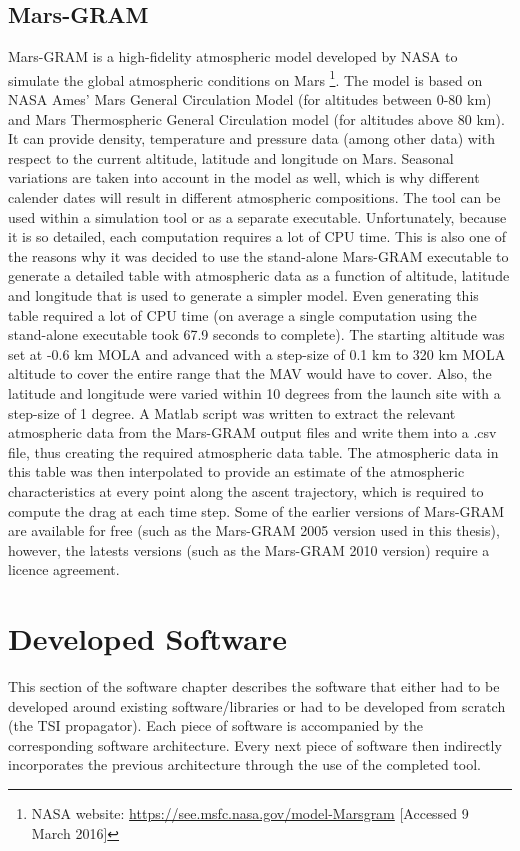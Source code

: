 \subsection{Mars-\ac{GRAM}}
\label{subsec:marsgram}
Mars-\ac{GRAM} is a high-fidelity atmospheric model developed by \ac{NASA} to simulate the global atmospheric conditions on Mars \citep{justus2008utilizing} \footnote{\ac{NASA} website: \url{https://see.msfc.nasa.gov/model-Marsgram} [Accessed 9 March 2016]}. The model is based on \ac{NASA} Ames' Mars General Circulation Model (for altitudes between 0-80 km) and Mars Thermospheric General Circulation model (for altitudes above 80 km). It can provide density, temperature and pressure data (among other data) with respect to the current altitude, latitude and longitude on Mars.  Seasonal variations are taken into account in the model as well, which is why different calender dates will result in different atmospheric compositions. The tool can be used within a simulation tool or as a separate executable. Unfortunately, because it is so detailed, each computation requires a lot of CPU time. This is also one of the reasons why it was decided to use the stand-alone Mars-\ac{GRAM} executable to generate a detailed table with atmospheric data as a function of altitude, latitude and longitude that is used to generate a simpler model. Even generating this table required a lot of CPU time (on average a single computation using the stand-alone executable took 67.9 seconds to complete). The starting altitude was set at -0.6 km \ac{MOLA} and advanced with a step-size of 0.1 km to 320 km \ac{MOLA} altitude to cover the entire range that the \ac{MAV} would have to cover. Also, the latitude and longitude were varied within 10 degrees from the launch site with a step-size of 1 degree. A Matlab script was written to extract the relevant atmospheric data from the Mars-\ac{GRAM} output files and write them into a .csv file, thus creating the required atmospheric data table. The atmospheric data in this table was then interpolated to provide an estimate of the atmospheric characteristics at every point along the ascent trajectory, which is required to compute the drag at each time step. Some of the earlier versions of Mars-\ac{GRAM} are available for free (such as the Mars-\ac{GRAM} 2005 version used in this thesis), however, the latests versions (such as the Mars-\ac{GRAM} 2010 version) require a licence agreement.


\section{Developed Software}
\label{sec:developedsoftware}
This section of the software chapter describes the software that either had to be developed around existing software/libraries or had to be developed from scratch (the \ac{TSI} propagator). Each piece of software is accompanied by the corresponding software architecture. Every next piece of software then indirectly incorporates the previous architecture through the use of the completed tool.


